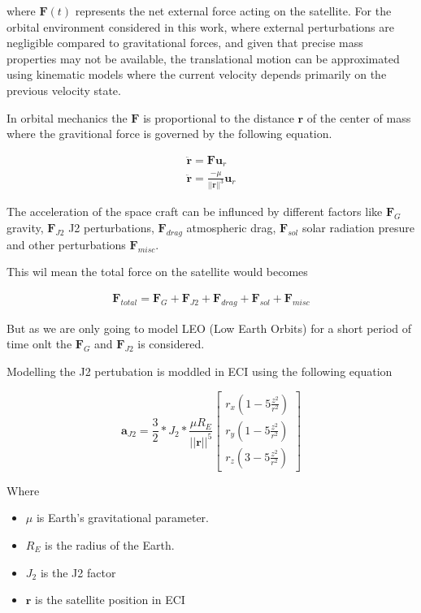 \noindent where $\mathbf{F}(t)$ represents the net external force acting on the satellite. For the orbital environment 
considered in this work, where external perturbations are negligible compared to gravitational forces, and given that 
precise mass properties may not be available, the translational motion can be approximated using kinematic models where 
the current velocity depends primarily on the previous velocity state.


In orbital mechanics the $\mathbf{F}$ is proportional to the distance $\mathbf{r}$ of the center of mass where the gravitional force is governed by the following equation.


\begin{align}
    \ddot{\mathbf{r}} = \mathbf{F}\mathbf{u}_r \\
    \ddot{\mathbf{r}} = \frac{-\mu}{||\mathbf{r}||^3}\mathbf{u}_r
\end{align}


The acceleration of the space craft can be influnced by different factors like $\mathbf{F}_{G}$ gravity, $\mathbf{F}_{J2}$ J2 perturbations, $\mathbf{F}_{drag}$ atmospheric drag,
$\mathbf{F}_{sol}$ solar radiation presure and other perturbations $\mathbf{F}_{misc}$.

This wil mean the total force on the satellite would becomes

\begin{align}
    \mathbf{F}_{total} = \mathbf{F}_{G} + \mathbf{F}_{J2} + \mathbf{F}_{drag} + \mathbf{F}_{sol} + \mathbf{F}_{misc}
\end{align}

But as we are only going to model LEO (Low Earth Orbits) for a short period of time onlt the $\mathbf{F}_{G}$ and $\mathbf{F}_{J2}$ is considered.

Modelling the J2 pertubation is moddled in ECI using the following equation

\begin{equation}
\mathbf{a}_{J2} = \frac{3}{2}*J_2*\frac{\mu R_E}{||\mathbf{r}||^5}
\begin{bmatrix}r_x(1-5\frac{z^2}{r^2}) \\
 r_y(1-5\frac{z^2}{r^2})\\
 r_z(3-5\frac{z^2}{r^2}) \end{bmatrix}
\end{equation}


Where 

\begin{itemize}
    \item $\mu$ is Earth's gravitational parameter.
    \item $R_E$ is the radius of the Earth.
    \item $J_2$ is the J2 factor
    \item $\mathbf{r}$ is the satellite position in ECI
\end{itemize}

